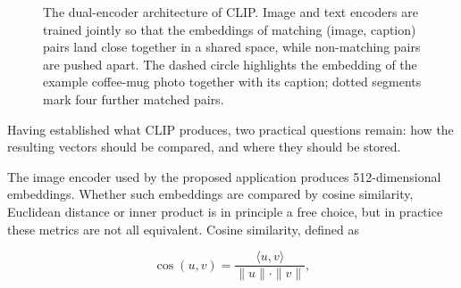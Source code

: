 \begin{figure}[ht]
\caption{The dual-encoder architecture of CLIP. Image and text encoders are trained jointly so that the embeddings of matching (image, caption) pairs land close together in a shared space, while non-matching pairs are pushed apart. The dashed circle highlights the embedding of the example coffee-mug photo together with its caption; dotted segments mark four further matched pairs.}
\label{fig:clip}
\end{figure}

Having established what CLIP produces, two practical questions remain: how the resulting vectors should be compared, and where they should be stored.

The image encoder used by the proposed application produces 512-dimensional embeddings. Whether such embeddings are compared by cosine similarity, Euclidean distance or inner product is in principle a free choice, but in practice these metrics are not all equivalent. Cosine similarity, defined as

\begin{equation}
\cos(u, v) = \frac{\langle u, v \rangle}{\|u\| \cdot \|v\|},
\label{eq:cosine}
\end{equation}

